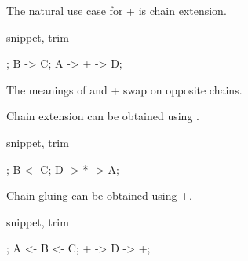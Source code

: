 The natural use case for {\ttfamily +} is chain extension.

\begin{tcblisting}{snippet, trim}
\begin{kodi}
;
\mor B -> C;
\mor A -> + -> D;
\end{kodi}
\end{tcblisting}

The meanings of {\ttfamily *} and {\ttfamily +} swap on opposite chains.

Chain extension can be obtained using {\ttfamily *}.

\begin{tcblisting}{snippet, trim}
\begin{kodi}
;
\mor B <- C;
\mor D -> * -> A;
\end{kodi}
\end{tcblisting}

Chain gluing can be obtained using {\ttfamily +}.

\begin{tcblisting}{snippet, trim}
\begin{kodi}
;
\mor A <- B <- C;
\mor + -> D -> +;
\end{kodi}
\end{tcblisting}

\endgroup
